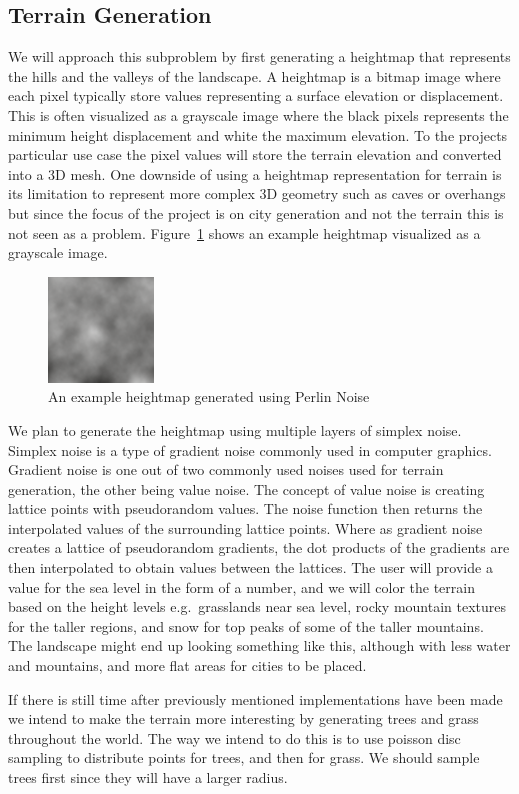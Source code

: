 \subsection{Terrain Generation}
We will approach this subproblem by first generating a heightmap that represents the hills and the valleys of the landscape. 
A heightmap is a bitmap image where each pixel typically store values representing a surface elevation or displacement.
This is often visualized as a grayscale image where the black pixels represents the minimum height displacement and white the maximum elevation.
To the projects particular use case the pixel values will store the terrain elevation and converted into a 3D mesh. %
One downside of using a heightmap representation for terrain is its limitation to represent more complex 3D geometry such as caves or overhangs but since the focus of the project is on city generation and not the terrain this is not seen as a problem.
Figure~\ref{fig:heightmap} shows an example heightmap visualized as a grayscale image.

\begin{figure}[h]
  \centering
  \includegraphics[width=0.25\textwidth]{figure/heightmap.png}
  \caption{An example heightmap generated using Perlin Noise} 
  \label{fig:heightmap}
\end{figure}

We plan to generate the heightmap using multiple layers of simplex noise.
Simplex noise is a type of gradient noise commonly used in computer graphics. 
Gradient noise is one out of two commonly used noises used for terrain generation, the other being value noise.  
The concept of value noise is creating lattice points with pseudorandom values. 
The noise function then returns the interpolated values of the surrounding lattice points. 
Where as gradient noise creates a lattice of pseudorandom gradients, the dot products of the gradients are then interpolated to obtain values between the lattices. 
The user will provide a value for the sea level in the form of a number, and we will color the terrain based on the height levels e.g.\ grasslands near sea level, rocky mountain textures for the taller regions, and snow for top peaks of some of the taller mountains.
The landscape might end up looking something like this, although with less water and mountains, and more flat areas for cities to be placed.

If there is still time after previously mentioned implementations have been made we intend to make the terrain more interesting by generating trees and grass throughout the world.
The way we intend to do this is to use poisson disc sampling to distribute points for trees, and then for grass. %
We should sample trees first since they will have a larger radius.  